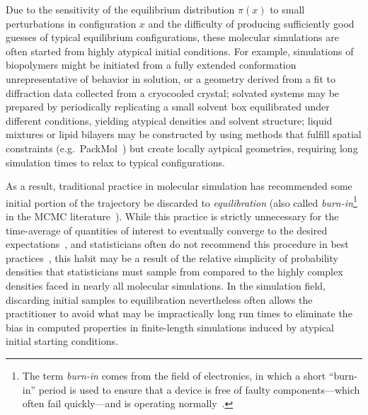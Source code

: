 \documentclass[aps,pre,twocolumn,nofootinbib,superscriptaddress,linenumbers,11point]{revtex4-1}
\begin{document}
Due to the sensitivity of the equilibrium distribution $\pi(x)$ to small perturbations in configuration $x$ and the difficulty of producing sufficiently good guesses of typical equilibrium configurations, these molecular simulations are often started from highly atypical initial conditions.
For example, simulations of biopolymers might be initiated from a fully extended conformation unrepresentative of behavior in solution, or a geometry derived from a fit to diffraction data collected from a cryocooled crystal; 
solvated systems may be prepared by periodically replicating a small solvent box equilibrated under different conditions, yielding atypical densities and solvent structure; 
liquid mixtures or lipid bilayers may be constructed by using methods that fulfill spatial constraints (e.g.~PackMol~\cite{martinez:jctc:2009:packmol}) but create locally aytpical geometries, requiring long simulation times to relax to typical configurations.

As a result, traditional practice in molecular simulation has recommended some initial portion of the trajectory be discarded to \emph{equilibration} (also called \emph{burn-in}\footnote{The term \emph{burn-in} comes from the field of electronics, in which a short ``burn-in'' period is used to ensure that a device is free of faulty components---which often fail quickly---and is operating normally~\cite{crc-mcmc-handbook}.} in the MCMC literature~\cite{crc-mcmc-handbook}).
While this practice is strictly unnecessary for the time-average of quantities of interest to eventually converge to the desired expectations~\cite{geyer:burn-in-unnecessary}, and statisticians often do not recommend this procedure in best practices~\cite{crc-mcmc-handbook}, this habit may be a result of the relative simplicity of probability densities that statisticians must sample from compared to the highly complex densities faced in nearly all molecular simulations.
In the simulation field, discarding initial samples to equilibration nevertheless often allows the practitioner to avoid what may be impractically long run times to eliminate the bias in computed properties in finite-length simulations induced by atypical initial starting conditions.
\end{document}
